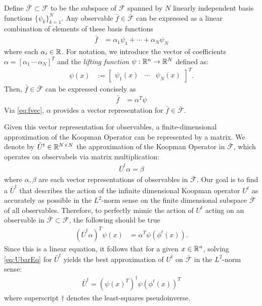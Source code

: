 Define ${\bar{\mathcal{F}} \subset \mathcal{F}}$ to be the subspace of $\mathcal{F}$ spanned by $N$ linearly independent basis functions $\{ \psi_k \}_{k=1}^N$.
Any observable $\bar{f} \in \bar{\mathcal{F}}$ can be expressed as a linear combination of elements of these basis functions
\begin{align}
    \bar{f} &= \alpha_1 \psi_1 + \cdots + \alpha_N \psi_N
\end{align}
where each $\alpha_i \in \mathbb{R}$.
For notation, we introduce the vector of coefficients ${\alpha = [ \alpha_1 \,  \cdots \, \alpha_N ]^T}$ and the \emph{lifting function} $\psi : \mathbb{R}^n \to \mathbb{R}^N$ defined as:
\begin{align}
    \psi(x) &:= \begin{bmatrix} \psi_1 (x) & \cdots & \psi_N (x) \end{bmatrix}^T.
    \label{eq:lift}
\end{align}
Then, $\bar{f} \in \bar{\mathcal{F}}$ can be expressed concisely as
\begin{align}
    \bar{f} &= \alpha^T \psi
    \label{eq:fvec}
\end{align}
Via \ref{eq:fvec}, $\alpha$ provides a vector representation for $\bar{f} \in \bar{\mathcal{F}}$.

Given this vector representation for observables, a finite-dimensional approximation of the Koopman Operator can be represented by a matrix.
We denote by $\bar{U}^t \in \mathbb{R}^{N \times N}$ the approximation of the Koopman Operator in $\bar{\mathcal{F}}$, which operates on observabels via matrix multiplication:
\begin{align}
    \bar{U}^t \alpha = \beta
\end{align}
where $\alpha , \beta$ are each vector representations of observables in $\bar{\mathcal{F}}$.
Our goal is to find a $\bar{U}^t$ that describes the action of the infinite dimensional Koopman operator $U^t$ as accurately as possible in the $L^2$-norm sense on the finite dimensional subspace $\bar{\mathcal{F}}$  of all observables.
Therefore, to perfectly mimic the action of $U^t$ acting on an observable in $\bar{\mathcal{F}} \subset \mathcal{F}$, the following should be true
\begin{align}
    ( \bar{U}^t {\alpha} )^T {\psi}(x) &=
    {\alpha}^T {\psi} \left( \phi^t(x) \right).
    \label{eq:UbarEq}
\end{align}
Since this is a linear equation, it follows that for a given ${x \in \mathbb{R}^n}$, solving \eqref{eq:UbarEq} for $\bar{U}^t$ yields the best approximation of $U^t$ on $\bar{\mathcal{F}}$ in the $L^2$-norm sense:
\begin{align}
    \bar{U}^t = \left( {\psi}(x)^T \right)^\dagger {\psi}( \phi^t(x) )^T
    \label{eq:Uapprox}
\end{align}
where superscript $\dagger$ denotes the least-squares pseudoinverse.


